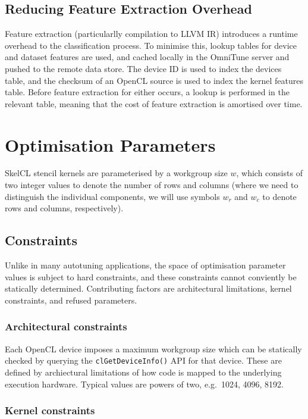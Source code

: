\subsection{Reducing Feature Extraction Overhead}


Feature extraction (particularlly compilation to LLVM IR) introduces a
runtime overhead to the classification process. To minimise this,
lookup tables for device and dataset features are used, and cached
locally in the OmniTune server and pushed to the remote data
store. The device ID is used to index the devices table, and the
checksum of an OpenCL source is used to index the kernel features
table. Before feature extraction for either occurs, a lookup is
performed in the relevant table, meaning that the cost of feature
extraction is amortised over time.


\section{Optimisation Parameters}\label{sec:op-params}

SkelCL stencil kernels are parameterised by a workgroup size $w$,
which consists of two integer values to denote the number of rows and
columns (where we need to distinguish the individual components, we
will use symbols $w_r$ and $w_c$ to denote rows and columns,
respectively).


\subsection{Constraints}

Unlike in many autotuning applications, the space of optimisation
parameter values is subject to hard constraints, and these constraints
cannot conviently be statically determined. Contributing factors are
architectural limitations, kernel constraints, and refused parameters.


\subsubsection{Architectural constraints}

Each OpenCL device imposes a maximum workgroup size which can be
statically checked by querying the \texttt{clGetDeviceInfo()} API for
that device. These are defined by archiectural limitations of how code
is mapped to the underlying execution hardware. Typical values are
powers of two, e.g.\ 1024, 4096, 8192.


\subsubsection{Kernel constraints}

